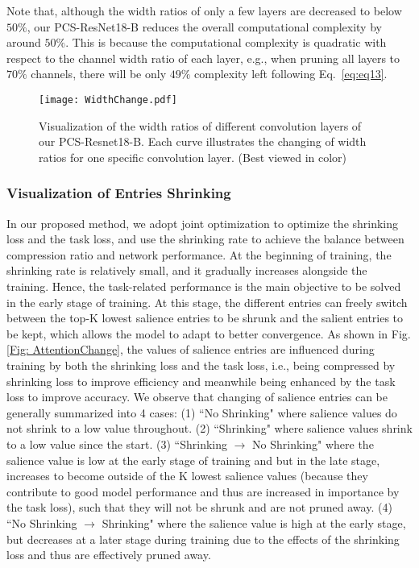 \documentclass[lettersize,journal]{IEEEtran}
\begin{document}
Note that, although the width ratios of only a few layers are decreased to below $50\%$, our PCS-ResNet18-B reduces the overall computational complexity by around $50\%$. This is because the computational complexity is quadratic with respect to the channel width ratio of each layer, e.g., when pruning all layers to $70\%$ channels, there will be only $49\%$ complexity left following Eq.~\ref{eq:eq13}. 

\begin{figure}[t]
  \center
  \texttt{[image: WidthChange.pdf]}
  \caption{
  Visualization of the width ratios of different convolution layers of our PCS-Resnet18-B. Each curve illustrates the changing of width ratios for one specific convolution layer. (Best viewed in color)}
  \label{Fig: WidthChange}  
\end{figure} 




\subsubsection{Visualization of Entries Shrinking}
\label{Attention Entries Shrinkin}

In our proposed method, we adopt joint optimization to optimize the shrinking loss and the task loss, and use the shrinking rate to achieve the balance between compression ratio and network performance. 
At the beginning of training, the shrinking rate is relatively small, and it gradually increases alongside the training. Hence, the task-related performance is the main objective to be solved in the early stage of training. At this stage, the different entries can freely switch between the top-K lowest salience entries to be shrunk and the salient entries to be kept, which allows the model to adapt to better convergence. 
As shown in Fig. \ref{Fig: AttentionChange}, the values of salience entries are influenced during training by both the shrinking loss and the task loss, i.e., being compressed by shrinking loss to improve efficiency and meanwhile being enhanced by the task loss to improve accuracy. 
We observe that changing of salience entries can be generally summarized into 4 cases: (1) ``No Shrinking" where salience values do not shrink to a low value throughout. (2) ``Shrinking" where salience values shrink to a low value since the start.
(3) ``Shrinking $\to$ No Shrinking" where the salience value is low at the early stage of training and but in the late stage, increases to become outside of the K lowest salience values (because they contribute to good model performance and thus are increased in importance by the task loss), such that they will not be shrunk and are not pruned away. 
(4) ``No Shrinking $\to$ Shrinking" where the salience value is high at the early stage, but decreases at a later stage during training due to the effects of the shrinking loss and thus are effectively pruned away. 
\end{document}
